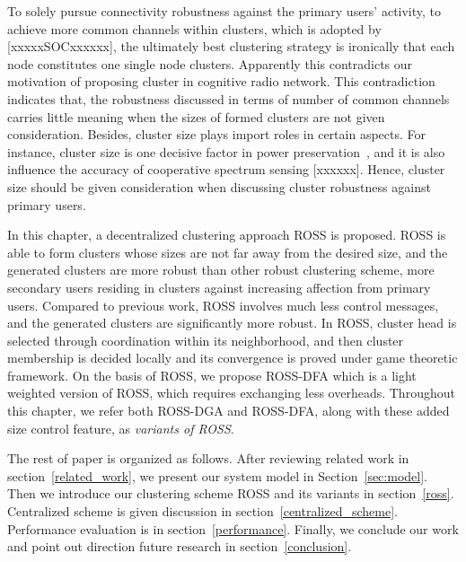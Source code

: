 To solely pursue connectivity robustness against the primary users' activity, \ie to achieve more common channels within clusters, which is adopted by [xxxxxSOCxxxxxx], the ultimately best clustering strategy is ironically that each node constitutes one single node clusters.
Apparently this contradicts our motivation of proposing cluster in cognitive radio network.
This contradiction indicates that, the robustness discussed in terms of number of common channels carries little meaning when the sizes of formed clusters are not given consideration.
Besides, cluster size plays import roles in certain aspects.
For instance, cluster size is one decisive factor in power preservation~\cite{clustering_globecom11, EnergyEfficientClusteringRouting_2015}, and it is also influence the accuracy of cooperative spectrum sensing [xxxxxx].
Hence, cluster size should be given consideration when discussing cluster robustness against primary users.

In this chapter, a decentralized clustering approach ROSS is proposed.
ROSS is able to form clusters whose sizes are not far away from the desired size, and the generated clusters are more robust than other robust clustering scheme, \ie more secondary users residing in clusters against increasing affection from primary users.
Compared to previous work, ROSS involves much less control messages, and the generated clusters are significantly more robust.
In ROSS, cluster head is selected through coordination within its neighborhood, and then cluster membership is decided locally and its convergence is proved under game theoretic framework. 
On the basis of ROSS, we propose ROSS-DFA which is a light weighted version of ROSS, which requires exchanging less overheads.
Throughout this chapter, we refer both ROSS-DGA and ROSS-DFA, along with these added size control feature, as \textit{variants of ROSS}. 

The rest of paper is organized as follows. 
After reviewing related work in section~\ref{related_work}, we present our system model in Section~\ref{sec:model}. 
Then we introduce our clustering scheme ROSS and its variants in section~\ref{ross}.
Centralized scheme is given discussion in section~\ref{centralized_scheme}.
Performance evaluation is in section~\ref{performance}.
Finally, we conclude our work and point out direction future research in section~\ref{conclusion}.


